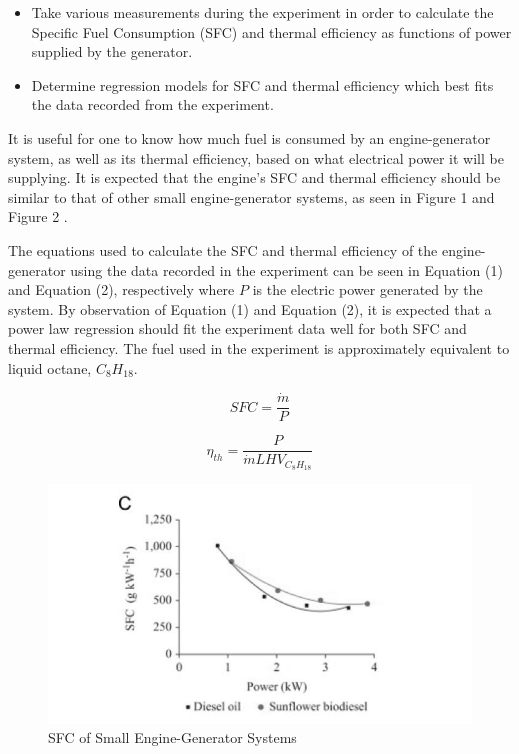 \documentclass[12pt]{article}
\begin{document}
\begin{itemize}

\item Take various measurements during the experiment in order to calculate the Specific Fuel Consumption (SFC) and thermal efficiency as functions of power supplied by the generator.
\item Determine regression models for SFC and thermal efficiency which best fits the data recorded from the experiment.

\end{itemize}


It is useful for one to know how much fuel is consumed by an engine-generator system, as well as its thermal efficiency, based on what electrical power it will be supplying. It is expected that the engine's SFC and thermal efficiency should be similar to that of other small engine-generator systems, as seen in Figure 1 and Figure 2 \cite{Silva}. 
\bigskip

The equations used to calculate the SFC and thermal efficiency of the engine-generator using the data recorded in the experiment can be seen in Equation (1) and Equation (2), respectively where $P$ is the electric power generated by the system. By observation of Equation (1) and Equation (2), it is expected that a power law regression should fit the experiment data well for both SFC and thermal efficiency. The fuel used in the experiment is approximately equivalent to liquid octane, $C_{8}H_{18}$.
\bigskip
\bigskip


\begin{equation}
SFC = \frac{\dot{m}}{P}
\end{equation}

\begin{equation}
\eta_{th} = \frac{P}{\dot{m}LHV_{C_{8}H_{18}}}
\end{equation}


\newpage


\begin{figure}[h!] %
   \centering
   \includegraphics[width=6in]{SFC_reference.JPG} 
   \caption{SFC of Small Engine-Generator Systems}
   \label{fig:example}
\end{figure}
\end{document}
